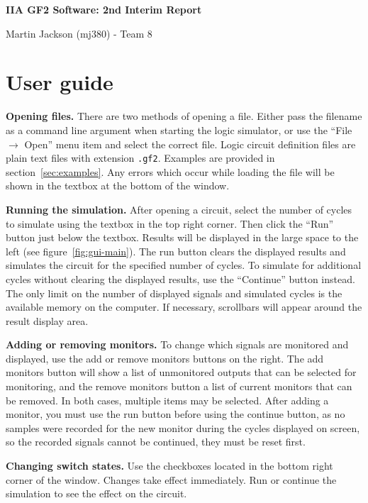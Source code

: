 \documentclass[a4paper,10pt]{article}
\begin{document}
\begin{center}
\LARGE \textbf{IIA GF2 Software: 2nd Interim Report}

\small Martin Jackson (mj380) - Team 8
\end{center}



\section{User guide}

\textbf{Opening files.} There are two methods of opening a file. Either pass the filename as a command line argument when starting the logic simulator, or use the ``File $\rightarrow$ Open'' menu item and select the correct file. Logic circuit definition files are plain text files with extension \texttt{.gf2}. Examples are provided in section~\ref{sec:examples}. Any errors which occur while loading the file will be shown in the textbox at the bottom of the window.

\textbf{Running the simulation.} After opening a circuit, select the number of cycles to simulate using the textbox in the top right corner. Then click the ``Run'' button just below the textbox. Results will be displayed in the large space to the left (see figure~\ref{fig:gui-main}). The run button clears the displayed results and simulates the circuit for the specified number of cycles. To simulate for additional cycles without clearing the displayed results, use the ``Continue'' button instead. The only limit on the number of displayed signals and simulated cycles is the available memory on the computer.  If necessary, scrollbars will appear around the result display area.

\textbf{Adding or removing monitors.} To change which signals are monitored and displayed, use the add or remove monitors buttons on the right. The add monitors button will show a list of unmonitored outputs that can be selected for monitoring, and the remove monitors button a list of current monitors that can be removed. In both cases, multiple items may be selected. After adding a monitor, you must use the run button before using the continue button, as no samples were recorded for the new monitor during the cycles displayed on screen, so the recorded signals cannot be continued, they must be reset first. 

\textbf{Changing switch states.} Use the checkboxes located in the bottom right corner of the window. Changes take effect immediately. Run or continue the simulation to see the effect on the circuit. 
\end{document}
